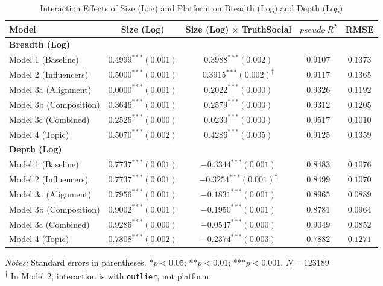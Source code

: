 \documentclass[letterpaper]{article} %
\begin{document}
\begin{table}[htbp]
\centering
\caption{Interaction Effects of Size (Log) and Platform on Breadth (Log) and Depth (Log)}
\label{model}
\begin{tabular}{lcccc}
\hline
\textbf{Model} & Size (Log) & Size (Log) $\times$ TruthSocial & $pseudo\ R^2$ & RMSE  \\
\hline
\hline
\multicolumn{5}{l}{\textbf{Breadth (Log)}} \\
\hline
Model 1 (Baseline) & $0.4999^{***} (0.001)$ & $0.3988^{***} (0.002)$ & $0.9107$ & $0.1373$  \\
Model 2 (Influencers) & $0.5000^{***} (0.001)$ & $0.3915^{***} (0.002)^{\dagger}$ & $0.9117$ & $0.1365$  \\
Model 3a (Alignment) &  $0.0000^{***} (0.001)$  & $0.2022^{***} (0.000)$ & $0.9326$ &$0.1192$ \\
Model 3b (Composition) &$0.3646^{***} (0.001)$  & $0.2579^{***} (0.000)$ & $0.9312$ &$0.1205$ \\
Model 3c (Combined) & $0.2526^{***} (0.000)$ & $0.0230^{***} (0.000)$ & $0.9517$ & $0.1010$  \\
Model 4 (Topic) & $0.5070^{***} (0.002)$ & $0.4286^{***} (0.005)$ & $0.9125$ & $0.1359$  \\
\hline
\hline
\multicolumn{5}{l}{\textbf{Depth (Log)}} \\
\hline
Model 1 (Baseline) & $0.7737^{***} (0.001)$ & $-0.3344^{***} (0.001)$ & $0.8483$ & $0.1076$  \\
Model 2 (Influencers) & $0.7737^{***} (0.001)$ & $-0.3254^{***} (0.001)^{\dagger}$ & $0.8499$ & $0.1070$  \\
Model 3a (Alignment) & $0.7956^{***} (0.001)$ &$-0.1831^{***} (0.001)$ & $0.8965$ & $0.0889$ \\
Model 3b (Composition) & $0.9002^{***} (0.001)$ &$-0.1950^{***} (0.001)$ & $0.8781$ & $0.0964$  \\
Model 3c (Combined) & $0.9286^{***} (0.000)$ & $-0.0547^{***} (0.000)$ & $0.9049$ & $ 0.0852$  \\
Model 4 (Topic) & $0.7808^{***} (0.002)$ & $-0.2374^{***} (0.003)$ & $0.7882$ & $0.1271$  \\
\hline
\hline
\end{tabular}

\vspace{1em}
\begin{minipage}{0.95\linewidth}
\footnotesize
\textit{Notes:} Standard errors in parentheses. *$p<0.05$; **$p<0.01$; ***$p<0.001$. $N=123189$ \\
\textsuperscript{†} In Model 2, interaction is with \texttt{outlier}, not platform.
\end{minipage}
\end{table}
\end{document}
